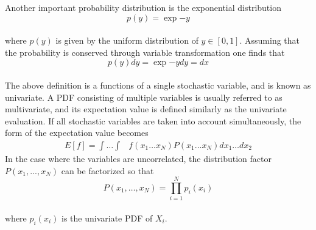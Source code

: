 \documentclass[%
reprint,nofootinbib,
amsmath,amssymb,
aps,
]{revtex4-1}
\begin{document}
Another important probability distribution is the exponential distribution \vspace{2mm} \\ 
\begin{equation}\label{exppdf}
	p(y) = \exp{-y}
\end{equation} \\
where $p(y)$ is given by the uniform distribution of $y\in[0,1]$. Assuming that the probability is conserved through variable transformation one finds that  \vspace{2mm}\\
\begin{equation*}
p(y)dy = \exp{-y}dy = dx
\end{equation*} \\ 
The above definition is a functions of a single stochastic variable, and is  known as univariate. A PDF consisting of multiple variables is usually referred to as multivariate, and its expectation value is defined similarly as the univariate evaluation. If all stochastic variables are taken into account simultaneously, the form of the expectation value becomes\vspace{2mm} 
\begin{align*}
	E[f] =  \int\dots\int &f(x_1\dots x_N)P(x_1\dots x_N)dx_1\dots dx_2
\end{align*}
In the case where the variables are uncorrelated, the distribution factor $P(x_1,...,x_N)$ can be factorized so that \\
\begin{equation*}
	P(x_1,\dots,x_N) = \prod_{i = 1}^{N} p_i(x_i)
\end{equation*} \\
where $p_i(x_i)$ is the univariate PDF of $X_i$. \vspace{2mm}
\end{document}
